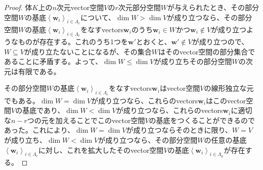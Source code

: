 \documentclass[dvipdfmx]{jsarticle}
\begin{document}
\begin{proof}
体$K$上の$n$次元vector空間$V$の$r$次元部分空間$W$が与えられたとき、その部分空間$W$の基底$\left\langle \mathbf{w}_{i} \right\rangle_{i \in \varLambda_{r}}$について、$\dim W > \dim V$が成り立つなら、その部分空間$W$の基底$\left\langle \mathbf{w}_{i} \right\rangle_{i \in \varLambda_{r}}$をなすvectors$\mathbf{w}_{i}$のうち$\mathbf{w}_{i} \in W$かつ$\mathbf{w}_{i} \notin V$が成り立つようなものが存在する。これのうち1つを$\mathbf{w}'$とおくと、$\mathbf{w}' \notin V$が成り立つので、$W \subseteq V$が成り立たないことになるが、その集合$W$はそのvector空間の部分集合であることに矛盾する。よって、$\dim W \leq \dim V$が成り立ちその部分空間$W$の次元は有限である。\par
その部分空間$W$の基底$\left\langle \mathbf{w}_{i} \right\rangle_{i \in \varLambda_{r}}$をなすvectors$\mathbf{w}_{i}$はvector空間$V$の線形独立な元でもある。$\dim W = \dim V$が成り立つなら、これらのvectors$\mathbf{w}_{i}$はこのvector空間$V$の基底であり、$\dim W < \dim V$が成り立つなら、これらのvectors$\mathbf{w}_{i}$に適切な$n - r$つの元を加えることでこのvector空間$V$の基底をつくることができるのであった。これにより、$\dim W = \dim V$が成り立つならそのときに限り、$W = V$が成り立ち、$\dim W < \dim V$が成り立つなら、その部分空間$W$の任意の基底$\left\langle \mathbf{w}_{i} \right\rangle_{i \in \varLambda_{r}}$に対し、これを拡大したそのvector空間$V$の基底$\left\langle \mathbf{w}_{i} \right\rangle_{i \in \varLambda_{n}}$が存在する。
\end{proof}
\end{document}
